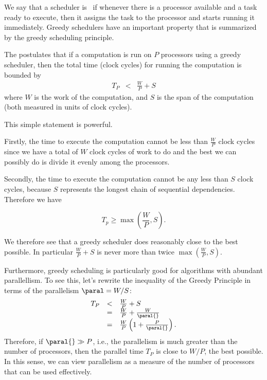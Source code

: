 \begin{definition}
We say that a scheduler is~ if whenever there is a
processor available and a task ready to execute, then it assigns the
task to the processor and starts running it immediately.  Greedy
schedulers have an important property that is summarized by the greedy
scheduling principle.
\end{definition}

\begin{definition}
\label{def:analysis::models::greedy}
The  postulates that if a
computation is run on $P$ processors using a greedy scheduler, then
the total time (clock cycles) for running the computation is bounded
by
\[
\begin{array}{lll}
T_P & < & \frac{W}{P} + S
\end{array}
\]
where $W$ is the work of the computation, and $S$ is the span of the
computation (both measured in units of clock cycles).
\end{definition}

\begin{gram}
This simple statement is powerful. 

Firstly, the time to execute the computation cannot be less than
$\frac{W}{P}$ clock cycles since we have a total of $W$ clock cycles
of work to do and the best we can possibly do is divide it evenly
among the processors.
%

Secondly, the time to execute the computation cannot be any less than
$S$ clock cycles, because $S$ represents the longest chain of
sequential dependencies.  Therefore we have

\[
T_p \geq \max{}\left(\frac{W}{P},S\right).
\]

We therefore see that a greedy scheduler does reasonably close to the
best possible.  In particular $\frac{W}{P} + S$ is never more than
twice $\max{}(\frac{W}{P},S)$.


Furthermore, greedy scheduling is particularly good for algorithms
with abundant parallellism.  To see this, let's rewrite the inequality
of the Greedy Principle
%
%
in terms of the parallelism $\paral = W/S$:
\[
\begin{array}{lll}
T_P & < & \frac{W}{P} + S \\
    & = &  \frac{W}{P} + \frac{W}{\paral{}}\\
    & = &  \frac{W}{P}\left(1 + \frac{P}{\paral{}}\right).
\end{array}
\]
Therefore, if $\paral{} \gg P$, i.e., the parallelism is much greater
than the number of processors, then the parallel time $T_P$ is close
to $W/P$, the best possible.  In this sense, we can view parallelism
as a measure of the number of processors that can be used effectively.
\end{gram}

